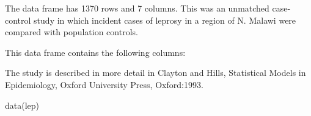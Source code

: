 \begin{Description}\relax
The  data frame has 1370 rows and 7 columns. This was an
unmatched case-control study in which incident cases of leprosy in a
region of N. Malawi were compared with population controls.
\end{Description}
\begin{Format}\relax
This data frame contains the following columns:
\end{Format}
\begin{Source}\relax
The study is described in more detail in Clayton and Hills, Statistical
Models in Epidemiology, Oxford University Press, Oxford:1993.
\end{Source}
\begin{Examples}
\begin{ExampleCode}
data(lep)
\end{ExampleCode}
\end{Examples}

